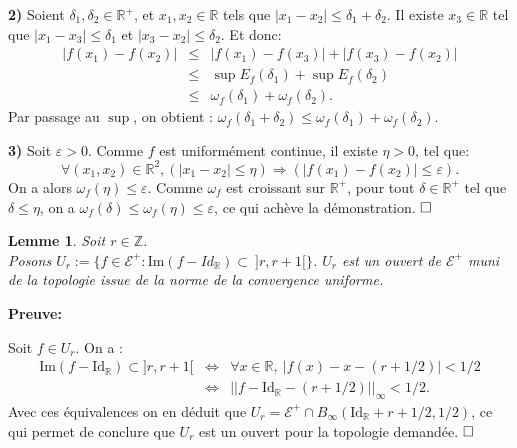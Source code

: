 \documentclass[11pt,a4 paper]{article}
\newtheorem{lemme}[theoreme]{Lemme}
\newcommand{\Rbb}{\mathbb{R}}
\newcommand{\Ec}{\mathcal{E}}
\newcommand{\Id}{\mathrm{Id}}
\newenvironment{lm}{\begin{box_lm}\begin{lemme}}{\end{lemme}\end{box_lm}}
\begin{document}
	\par \textbf{2)} Soient $\delta_1,\delta_2 \in \mathbb{R}^+$, et $x_1, x_2 \in \mathbb{R}$ tels que $|x_1 -x_2|\leq \delta_1 + \delta_2$. Il existe $x_3 \in \mathbb{R}$ tel que $|x_1 -x_3|\leq \delta_1$ et $|x_3 -x_2|\leq \delta_2$. Et donc:
	\begin{eqnarray*}
		|f(x_1)-f(x_2)|&\leq& |f(x_1)-f(x_3)| + |f(x_3)-f(x_2)|\\
			&\leq& \sup E_f(\delta_1) + \sup E_f(\delta_2)\\
			&\leq& \omega_f(\delta_1) + \omega_f(\delta_2).
	\end{eqnarray*}
	Par passage au $\sup$, on obtient : $\omega_f(\delta_1 + \delta_2) \leq \omega_f(\delta_1) +\omega_f(\delta_2)$.\\
	
	\par \textbf{3)} Soit $\varepsilon > 0$. Comme $f$ est uniformément continue, il existe $\eta >0$, tel que:
	$$\forall (x_1,x_2) \in \mathbb{R}^2, ( |x_1-x_2|\leq \eta) \Longrightarrow (|f(x_1)-f(x_2)|\leq \varepsilon).  $$
	On a alors $\omega_f(\eta)\leq\varepsilon$. Comme $\omega_f$ est croissant sur $\mathbb{R}^+$, pour tout $\delta \in \mathbb{R}^+$ tel que $\delta \leq \eta$, on a $\omega_f(\delta)\leq\omega_f(\eta)\leq\varepsilon$, ce qui achève la démonstration. $\hfill \square$\\














\begin{lm}\label{ouvertUr}
	Soit $r \in \mathbb{Z}$.\\
	Posons $U_r:=\lbrace f \in \mathcal{E}^+: \mathrm{Im}(f-Id_{\mathbb{R}}) \subset\ ]r,r+1[\rbrace$. $U_r$ est un ouvert de $\mathcal{E}^+$ muni de la topologie issue de la norme de la convergence uniforme.
\end{lm}
\newpage
	\textbf{Preuve:}
	\par Soit $f\in U_r$. On a :
	\begin{eqnarray*}
		\mathrm{Im}(f - \Id_{\Rbb}) \subset ]r,r+1[ &\Longleftrightarrow& \forall x \in \Rbb,\ |f(x)-x-(r+1/2)|< 1/2\\
		&\Longleftrightarrow& ||f - \Id_\Rbb - (r + 1/2) ||_{\infty} < 1/2.
	\end{eqnarray*}
	Avec ces équivalences on en déduit que $U_r = \Ec^+ \cap  B_{\infty}(\Id_\Rbb+r + 1/2,1/2)$, ce qui permet de conclure que $U_r$ est un ouvert pour la topologie demandée.
	 $\hfill \square$\\
\end{document}

